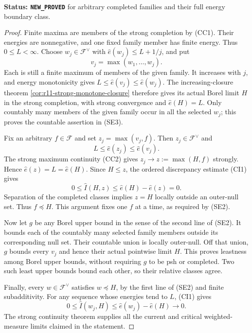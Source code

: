 \noindent\textbf{Status: \texttt{NEW\_PROVED}} for arbitrary
completed families and their full energy boundary class.

\begin{proof}
Finite maxima are members of the strong completion by (CC1).
Their energies are nonnegative, and one fixed family member
has finite energy. Thus $0\leq L<\infty$.
Choose $w_j\in\mathscr F^\vee$ with
$\widehat e(w_j)\leq L+1/j$, and put
\[
                            v_j=\max(w_1,\ldots,w_j).
 \tag{SE4}
\]
Each is still a finite maximum of members of the given family.
It increases with $j$, and energy monotonicity gives
$L\leq\widehat e(v_j)\leq\widehat e(w_j)$.
The increasing-closure theorem
\ref{cor:r11-strong-monotone-closure} therefore gives its
actual Borel limit $H$ in the strong completion, with strong
convergence and $\widehat e(H)=L$.
Only countably many members of the given family occur in all the
selected $w_j$; this proves the countable assertion in (SE3).

Fix an arbitrary $f\in\mathscr F$ and set $z_j=\max(v_j,f)$.
Then $z_j\in\mathscr F^\vee$ and
\[
                       L\leq\widehat e(z_j)
                                      \leq\widehat e(v_j).
\]
The strong maximum continuity (CC2) gives
$z_j\to z:=\max(H,f)$ strongly. Hence
$\widehat e(z)=L=\widehat e(H)$.
Since $H\leq z$, the ordered discrepancy estimate (CI1)
gives
\[
               0\leq\widehat I(H,z)
                      \leq\widehat e(H)-\widehat e(z)=0.
 \tag{SE5}
\]
Separation of the completed classes implies $z=H$
locally outside an outer-null set. Thus $f\preceq H$.
This argument fixes one $f$ at a time, as required by (SE2).

Now let $g$ be any Borel upper bound in the sense of the
second line of (SE2). It bounds each of the countably many
selected family members outside its corresponding null set.
Their countable union is locally outer-null. Off that union,
$g$ bounds every $v_j$ and hence their actual pointwise
limit $H$. This proves leastness among Borel upper bounds,
without requiring $g$ to be psh or completed.
Two such least upper bounds bound each other, so their
relative classes agree.

Finally, every $w\in\mathscr F^\vee$ satisfies $w\preceq H$,
by the first line of (SE2) and finite subadditivity.
For any sequence whose energies tend to $L$, (CI1) gives
\[
             0\leq\widehat I(w_j,H)
                    \leq\widehat e(w_j)-\widehat e(H)
                                      \longrightarrow0.
 \tag{SE6}
\]
The strong continuity theorem supplies all the current and
critical weighted-measure limits claimed in the statement.
\end{proof}

